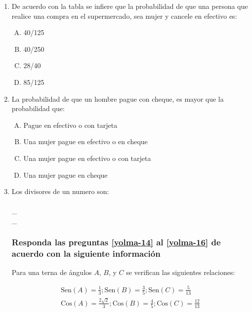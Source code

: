 \begin{enumerate}
\newpage
\item De acuerdo con la tabla se infiere que la probabilidad de que una persona que realice una compra en el supermercado, sea mujer y cancele en efectivo es: \label{yolma-11}\\

\begin{enumerate}[(A)]
\item  40/125
\item 40/250
\item 28/40
\item 85/125
\end{enumerate}


\item La probabilidad de que un hombre pague con cheque, es mayor que la probabilidad que: \label{yolma-12}\\

\begin{enumerate}[(A)]
\item  Pague en efectivo o con tarjeta
\item Una mujer pague en efectivo o en cheque
\item Una mujer pague en efectivo o con tarjeta
\item Una mujer pague en cheque
\end{enumerate}


\item Los divisores de un numero son:\label{yolma-13}\\\hrulefill\\
\_\hrulefill\\
\_\hrulefill\\




\subsubsection*{Responda las preguntas \ref{yolma-14} al \ref{yolma-16} de acuerdo con la siguiente información}
Para una terna de ángulos $A$, $B$, y $C$ se verifican las siguientes relaciones:

\begin{gather*}
\text{Sen}(A)=\frac13; \text{Sen}(B)=\frac35; \text{Sen}(C)=\frac{5}{13}\\
\text{Cos}(A)=\frac{2\sqrt{2}}{3}; \text{Cos}(B)=\frac45; \text{Cos}(C)=\frac{12}{13}
\end{gather*}


\end{enumerate}
